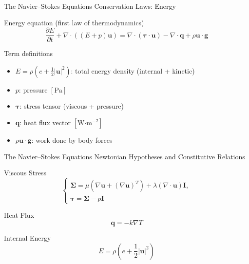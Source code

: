 \begin{frame}{The Navier--Stokes Equations}
\small
\textcolor{red_unipd}{\Large Conservation Laws: Energy}

\vspace{0.8em}

\begin{alertblock}{Energy equation (first law of thermodynamics)}
\[
\dfrac{\partial E}{\partial t}
+ \nabla\!\cdot\!((E+p)\mathbf{u})
= \nabla\!\cdot\!(\boldsymbol{\tau}\!\cdot\!\mathbf{u})
- \nabla\!\cdot\!\mathbf{q}
+ \rho \mathbf{u}\!\cdot\!\mathbf{g}
\]
\end{alertblock}

\begin{block}{Term definitions}
\begin{itemize}
  \item \(E = \rho\!\left(e + \tfrac{1}{2}|\mathbf{u}|^2\right)\): total energy density (internal + kinetic)
  \item \(p\): pressure \([\text{Pa}]\)
  \item \(\boldsymbol{\tau}\): stress tensor (viscous + pressure)
  \item \(\mathbf{q}\): heat flux vector \([\text{W·m}^{-2}]\)
  \item \(\rho \mathbf{u}\!\cdot\!\mathbf{g}\): work done by body forces
\end{itemize}
\end{block}
\end{frame}




\begin{frame}{The Navier--Stokes Equations}
\small
\textcolor{red_unipd}{\Large Newtonian Hypotheses and Constitutive Relations}

\begin{alertblock}{Viscous Stress}
\[
\begin{cases}
\boldsymbol{\Sigma} = \mu\left(\nabla \mathbf{u} + (\nabla \mathbf{u})^T\right) + \lambda (\nabla\!\cdot\!\mathbf{u}) \mathbf{I},\\[4pt]
\boldsymbol{\tau} = \boldsymbol{\Sigma} - p \mathbf{I}
\end{cases}
\]
\end{alertblock}

\begin{alertblock}{Heat Flux}
\[
\mathbf{q} = -k \nabla T
\]
\end{alertblock}

\begin{alertblock}{Internal Energy}
\[
E = \rho\left(e + \dfrac{1}{2}|\mathbf{u}|^2\right)
\]
\end{alertblock}

\end{frame}




